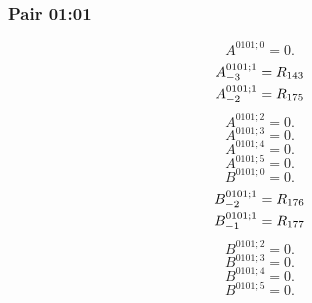 \documentclass[11pt,a4paper]{article}
\begin{document}
\subsubsection{Pair 01:01}
\begin{equation}
A^{0101;0}=0.
\label{eq:cat-map-66}
\end{equation}
\begin{equation}
\shortstack[l]{$\displaystyle A^{0101;1}_{-3}=R_{143}$\\
$\displaystyle A^{0101;1}_{-2}=R_{175}$}
\label{eq:cat-map-67}
\end{equation}
\begin{equation}
A^{0101;2}=0.
\label{eq:cat-map-68}
\end{equation}
\begin{equation}
A^{0101;3}=0.
\label{eq:cat-map-69}
\end{equation}
\begin{equation}
A^{0101;4}=0.
\label{eq:cat-map-70}
\end{equation}
\begin{equation}
A^{0101;5}=0.
\label{eq:cat-map-71}
\end{equation}
\begin{equation}
B^{0101;0}=0.
\label{eq:cat-map-72}
\end{equation}
\begin{equation}
\shortstack[l]{$\displaystyle B^{0101;1}_{-2}=R_{176}$\\
$\displaystyle B^{0101;1}_{-1}=R_{177}$}
\label{eq:cat-map-73}
\end{equation}
\begin{equation}
B^{0101;2}=0.
\label{eq:cat-map-74}
\end{equation}
\begin{equation}
B^{0101;3}=0.
\label{eq:cat-map-75}
\end{equation}
\begin{equation}
B^{0101;4}=0.
\label{eq:cat-map-76}
\end{equation}
\begin{equation}
B^{0101;5}=0.
\label{eq:cat-map-77}
\end{equation}
\end{document}
